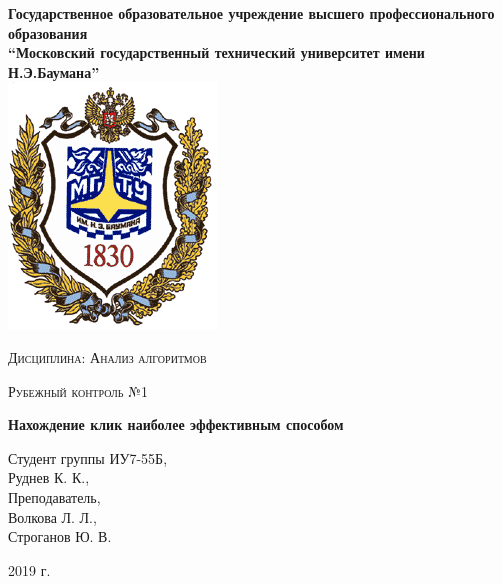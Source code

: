 \documentclass[a4paper,12pt]{report}
\begin{document}
    \begin{titlepage}

        \begin{center}
            \large
            \textbf{Государственное образовательное учреждение высшего профессионального образования\\
            “Московский государственный технический университет имени Н.Э.Баумана”\\}
            \includegraphics{bmstu-logo.png}
			\vspace{1cm}
            
            \textsc{Дисциплина: Анализ алгоритмов}
            \vspace{0.5cm}
                
            \textsc{Рубежный контроль №1}
            \vspace{1cm}
            
            {\LARGE \textbf{Нахождение клик наиболее эффективным способом}}
            \vspace{3cm}
                    
            \begin{flushright}
            	Студент группы ИУ7-55Б,\\   
            	Руднев К. К.,\\
            	\vspace{0.5cm}
            	Преподаватель,\\
            	Волкова Л. Л.,\\
            	Строганов Ю. В.
            	
            \end{flushright}
            \vfill
            
            2019 г.
            
        \end{center}

    \end{titlepage}
\end{document}
